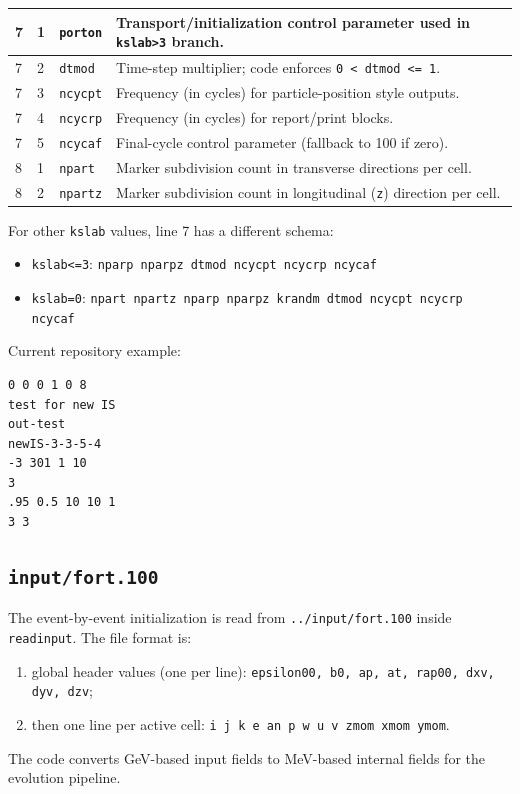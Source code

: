 \documentclass[11pt,a4paper]{article}
\begin{document}
\begin{longtable}{|p{1.2cm}|p{1.0cm}|p{3.0cm}|p{6.5cm}|}
7 & 1 & \texttt{porton} & Transport/initialization control parameter used in \texttt{kslab>3} branch. \\\hline
7 & 2 & \texttt{dtmod} & Time-step multiplier; code enforces \texttt{0 < dtmod <= 1}. \\\hline
7 & 3 & \texttt{ncycpt} & Frequency (in cycles) for particle-position style outputs. \\\hline
7 & 4 & \texttt{ncycrp} & Frequency (in cycles) for report/print blocks. \\\hline
7 & 5 & \texttt{ncycaf} & Final-cycle control parameter (fallback to 100 if zero). \\\hline
8 & 1 & \texttt{npart} & Marker subdivision count in transverse directions per cell. \\\hline
8 & 2 & \texttt{npartz} & Marker subdivision count in longitudinal (\texttt{z}) direction per cell. \\\hline
\end{longtable}

For other \texttt{kslab} values, line 7 has a different schema:
\begin{itemize}
\item \texttt{kslab<=3}: \texttt{nparp nparpz dtmod ncycpt ncycrp ncycaf}
\item \texttt{kslab=0}: \texttt{npart npartz nparp nparpz krandm dtmod ncycpt ncycrp ncycaf}
\end{itemize}

Current repository example:
\begin{verbatim}
0 0 0 1 0 8
test for new IS
out-test
newIS-3-3-5-4
-3 301 1 10
3
.95 0.5 10 10 1
3 3
\end{verbatim}

\subsection{\texttt{input/fort.100}}
The event-by-event initialization is read from \texttt{../input/fort.100}
inside \texttt{readinput}. The file format is:
\begin{enumerate}
\item global header values (one per line):
\texttt{epsilon00, b0, ap, at, rap00, dxv, dyv, dzv};
\item then one line per active cell:
\texttt{i j k e an p w u v zmom xmom ymom}.
\end{enumerate}

The code converts GeV-based input fields to MeV-based internal fields
for the evolution pipeline.
\end{document}
